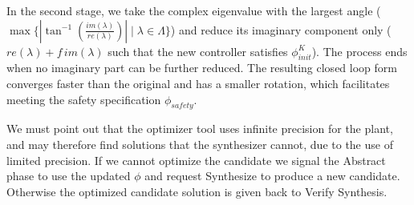 \documentclass[sigconf]{llncs}
\begin{document}
In the second stage, we take the complex eigenvalue with the largest angle
($\max\{|\tan^{-1}\left(\frac{im(\lambda)}{re(\lambda)}\right)| \mid \lambda
\in \Lambda\}$) and reduce its imaginary component only ($re(\lambda) + f\,
im(\lambda)$ such that the new controller satisfies $\phi_\mathit{init}^K$). 
The process ends when no imaginary part can be further reduced.  The
resulting closed loop form converges faster than the original and has a
smaller rotation, which facilitates meeting the safety specification
$\phi_\mathit{safety}$.

We must point out that the optimizer tool uses infinite precision for the
plant, and may therefore find solutions that the synthesizer cannot, due to
the use of limited precision.  If we cannot optimize the candidate we signal
the {\sc Abstract} phase to use the updated $\phi$ and request {\sc
Synthesize} to produce a new candidate.  Otherwise the optimized candidate
solution is given back to {\sc Verify Synthesis}.
\end{document}
